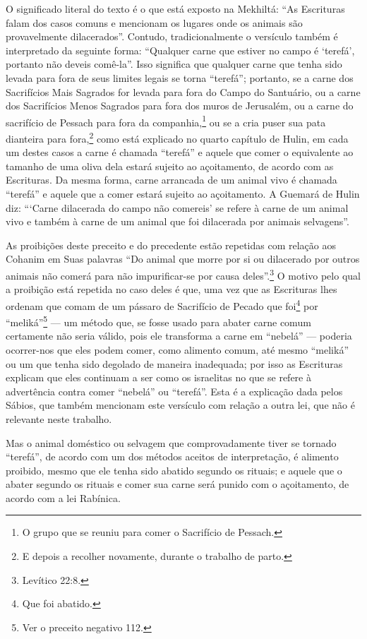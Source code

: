 O significado literal do texto é o que está exposto na Mekhiltá: ``As
Escrituras falam dos casos comuns e mencionam os lugares onde os
animais são provavelmente dilacerados''. Contudo, tradicionalmente o
versículo também é interpretado da seguinte forma: ``Qualquer carne que
estiver no campo é `terefá', portanto não deveis comê-la''. Isso
significa que qualquer carne que tenha sido levada para fora de seus
limites legais se torna ``terefá''; portanto, se a carne dos Sacrifícios
Mais Sagrados for levada para fora do Campo do Santuário, ou a carne
dos Sacrifícios Menos Sagrados para fora dos muros de Jerusalém, ou a
carne do sacrifício de Pessach para fora da companhia,\footnote{O grupo que se reuniu para comer o Sacrifício de Pessach.} ou se a cria puser sua pata dianteira para
fora,\footnote{E depois a recolher novamente, durante o trabalho de parto.} como está explicado no quarto capítulo de
Hulin, em cada um destes casos a carne é chamada ``terefá'' e aquele que
comer o equivalente ao tamanho de uma oliva dela estará sujeito ao
açoitamento, de acordo com as Escrituras. Da mesma forma, carne
arrancada de um animal vivo é chamada ``terefá'' e aquele que a comer
estará sujeito ao açoitamento. A Guemará de Hulin diz: ```Carne
dilacerada do campo não comereis' se refere à carne de um animal vivo e
também à carne de um animal que foi dilacerada por animais selvagens''.

As proibições deste preceito e do precedente estão repetidas com relação
aos Cohanim em Suas palavras ``Do animal que morre por si ou
dilacerado por outros animais não comerá para não impurificar-se por
causa deles''.\footnote{Levítico 22:8.} O motivo pelo qual a proibição está
repetida no caso deles é que, uma vez que as Escrituras lhes ordenam que
comam de um pássaro de Sacrifício de Pecado que
foi\footnote{Que foi abatido.} por ``meliká''\footnote{Ver o preceito negativo 112.} --- um
método que, se fosse usado para abater carne comum certamente não seria
válido, pois ele transforma a carne em ``nebelá'' --- poderia
ocorrer-nos que eles podem comer, como alimento comum, até mesmo
``meliká'' ou um que tenha sido degolado de maneira inadequada; por
isso as Escrituras explicam que eles continuam a ser como os israelitas
no que se refere à advertência contra comer ``nebelá'' ou ``terefá''.
Esta é a explicação dada pelos Sábios, que também mencionam este
versículo com relação a outra lei, que não é relevante neste trabalho.

Mas o animal doméstico ou selvagem que comprovadamente tiver se tornado
``terefá'', de acordo com um dos métodos aceitos de interpretação, é
alimento proibido, mesmo que ele tenha sido abatido segundo os rituais;
e aquele que o abater segundo os rituais e comer sua carne será punido
com o açoitamento, de acordo com a lei Rabínica.

